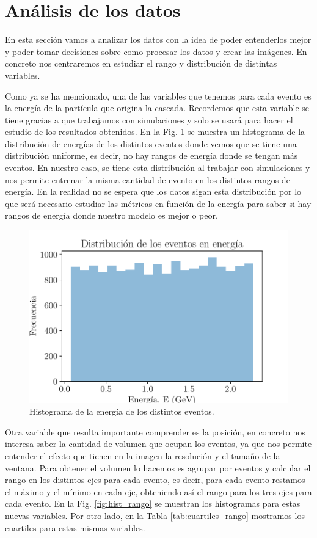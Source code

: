 \documentclass[a4paper,12pt,twoside,titlepage]{article}
\begin{document}
\section{Análisis de los datos}

En esta sección vamos a analizar los datos con la idea de poder entenderlos mejor y poder tomar decisiones sobre como procesar los datos y crear las imágenes. En concreto nos centraremos en estudiar el rango y distribución de distintas variables.

Como ya se ha mencionado, una de las variables que tenemos para cada evento es la energía de la partícula que origina la cascada. Recordemos que esta variable se tiene gracias a que trabajamos con simulaciones y solo se usará para hacer el estudio de los resultados obtenidos. En la Fig. \ref{fig:hist_energia} se muestra un histograma de la distribución de energías de los distintos eventos donde vemos que se tiene una distribución uniforme, es decir, no hay rangos de energía donde se tengan más eventos. En nuestro caso, se tiene esta distribución al trabajar con simulaciones y nos permite entrenar la misma cantidad de evento en los distintos rangos de energía. En la realidad no se espera que los datos sigan esta distribución por lo que será necesario estudiar las métricas en función de la energía para saber si hay rangos de energía donde nuestro modelo es mejor o peor.

\begin{figure}[h!]
  \centering
  \includegraphics[scale=0.85]{hist_en.pdf}
  \caption{Histograma de la energía de los distintos eventos.}
  \label{fig:hist_energia}
\end{figure}

Otra variable que resulta importante comprender es la posición, en concreto nos interesa saber la cantidad de volumen que ocupan los eventos, ya que nos permite entender el efecto que tienen en la imagen la resolución y el tamaño de la ventana. Para obtener el volumen lo hacemos es agrupar por eventos y calcular el rango en los distintos ejes para cada evento, es decir, para cada evento restamos el máximo y el mínimo en cada eje, obteniendo así el rango para los tres ejes para cada evento. En la Fig. \ref{fig:hist_rango} se muestran los histogramas para estas nuevas variables. Por otro lado, en la Tabla \ref{tab:cuartiles_rango} mostramos los cuartiles para estas mismas variables.
\end{document}
